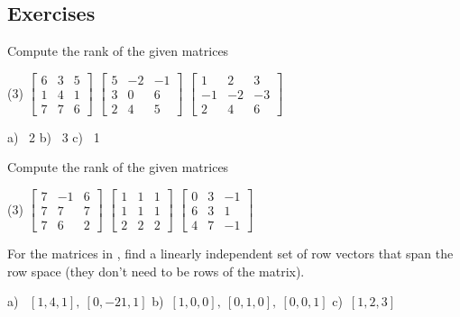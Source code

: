 \subsection{Exercises}

\begin{exercise} \label{exercise:rankmatrix}
Compute the rank of the given matrices
\begin{tasks}(3)
\task
$\begin{bmatrix}
6 & 3 & 5 \\
1 & 4 & 1 \\
7 & 7 & 6
\end{bmatrix}$
\task
$\begin{bmatrix}
5 & -2 & -1 \\
3 & 0 & 6 \\
2 & 4 & 5
\end{bmatrix}$
\task
$\begin{bmatrix}
1 & 2 & 3 \\
-1 & -2 & -3 \\
2 & 4 & 6
\end{bmatrix}$
\end{tasks}
\end{exercise}
\comboSol{%
}
{%
a)~ 2 \quad b)~ 3 \quad c)~ 1
}

\begin{exercise} \label{exercise:rankmatrixans}\ansMark%
Compute the rank of the given matrices
\begin{tasks}(3)
\task
$\begin{bmatrix}
7 & -1 & 6 \\
7 & 7 & 7 \\
7 & 6 & 2
\end{bmatrix}$
\task
$\begin{bmatrix}
1 & 1 & 1 \\
1 & 1 & 1 \\
2 & 2 & 2
\end{bmatrix}$
\task
$\begin{bmatrix}
0 & 3 & -1 \\
6 & 3 & 1 \\
4 & 7 & -1
\end{bmatrix}$
\end{tasks}
\end{exercise}


\begin{exercise}
For the matrices in , find
a linearly independent set of row vectors that span the row space
(they don't need to be rows of the matrix).
\end{exercise}
\comboSol{%
}
{%
a)~ $[1, 4, 1],\ [0, -21, 1]$ \quad b)~$[1,0,0],\ [0,1,0],\ [0,0,1]$ \quad c)~$[1,2,3]$
}

